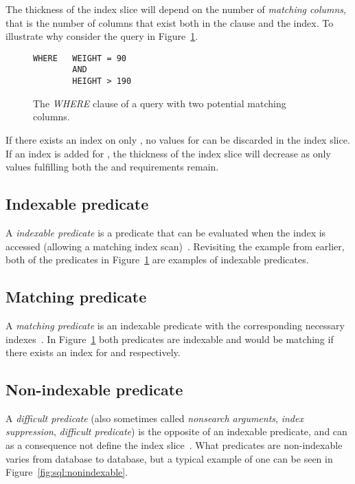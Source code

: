 The thickness of the index slice will depend on the number of \textit{matching columns}, that is the number of columns that exist both in the  clause and the index. To illustrate why consider the query in Figure~\ref{fig:sql:indexslice}.

\begin{figure}[ht]
\begin{verbatim}
WHERE   WEIGHT = 90
        AND
        HEIGHT > 190
\end{verbatim}
\caption[The \textit{WHERE} clause of a query with two potential matching columns]{The \textit{WHERE} clause of a query with two potential matching columns.}\label{fig:sql:indexslice}
\end{figure}

If there exists an index on only , no values for  can be discarded in the index slice. If an index is added for , the thickness of the index slice will decrease as only values fulfilling both the  and  requirements remain.

\subsection*{Indexable predicate}
A \textit{indexable predicate} is a predicate that can be evaluated when the index is accessed (allowing a matching index scan)~\cite{2014_summary_sopp, 2013_ibm_ikcianp}. Revisiting the example from earlier, both of the predicates in Figure~\ref{fig:sql:indexslice} are examples of indexable predicates.

\subsection*{Matching predicate}
A \textit{matching predicate} is an indexable predicate with the corresponding necessary indexes~\cite{2013_ibm_ikcianp}. In Figure~\ref{fig:sql:indexslice} both predicates are indexable and would be matching if there exists an index for  and  respectively.

\subsection*{Non-indexable predicate}
A \textit{difficult predicate} (also sometimes called \textit{nonsearch arguments}, \textit{index suppression}, \textit{difficult predicate}) is the opposite of an indexable predicate, and can as a consequence not define the index slice~\cite{lahdenmaki_2005_relational_rdidatodossea}. What predicates are non-indexable varies from database to database, but a typical example of one can be seen in Figure~\ref{fig:sql:nonindexable}.

